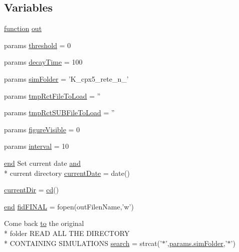 \subsection*{Variables}
\begin{DoxyCompactItemize}
\item 
\hyperlink{a00110_a4b4c670b101bf7a838f775e008fa6255}{function} \hyperlink{a00028_a34c820385e9209f49c18739329ad9206}{out}
\item 
params \hyperlink{a00028_aa022cbb28f80299d572def08e7a5ccfd}{threshold} = 0
\item 
params \hyperlink{a00028_abd7ce2c4bf5f563b1e70731f58e8c57d}{decay\+Time} = 100
\item 
params \hyperlink{a00028_a0ffb8131632b48d9111c3a27d91262e2}{sim\+Folder} = 'K\+\_\+cpx5\+\_\+rete\+\_\+n\+\_\+'
\item 
params \hyperlink{a00028_a3b01c97f207a2997c3bd0c2718441509}{tmp\+Rct\+File\+To\+Load} = ''
\item 
params \hyperlink{a00028_ae5d21adddbfe36d5b10d43a2e8b39123}{tmp\+Rct\+S\+U\+B\+File\+To\+Load} = ''
\item 
params \hyperlink{a00028_a0eef57d24680b0a2e17d81a50229e3cb}{figure\+Visible} = 0
\item 
params \hyperlink{a00028_a4d8f56ee83b9b4dbe17b218746a1768c}{interval} = 10
\item 
\hyperlink{a00025_afb358f48b1646c750fb9da6c6585be2b}{end} Set current date \hyperlink{a00028_a170f8acb213f91bf71c77b1d20bceb33}{and} \\*
current directory \hyperlink{a00028_a54768c0405781065cb2f7a16ab8e7d31}{current\+Date} = date()
\item 
\hyperlink{a00028_af32eb97339f1e9d37b5540de2cbc79c9}{current\+Dir} = \hyperlink{a00113_abe327856a9ee2f30f3ccafe4dc9edf5e}{cd}()
\item 
\hyperlink{a00025_afb358f48b1646c750fb9da6c6585be2b}{end} \hyperlink{a00028_a2f1bf22f6a0c3f5791577061e92c0433}{fid\+F\+I\+N\+A\+L} = fopen(out\+Filen\+Name,'w')
\item 
Come back \hyperlink{a00028_af71dbe52628a3f83a77ab494817525c6}{to} the original \\*
folder R\+E\+A\+D A\+L\+L T\+H\+E D\+I\+R\+E\+C\+T\+O\+R\+Y \\*
C\+O\+N\+T\+A\+I\+N\+I\+N\+G S\+I\+M\+U\+L\+A\+T\+I\+O\+N\+S \hyperlink{a00028_ab3186e0326a3b47b2cfcb5577ab5139f}{search} = strcat('$\ast$',\hyperlink{a00032_aa671e3345005bd599e662bcaa115b18a}{params.\+sim\+Folder},'$\ast$')
\item 

\end{DoxyCompactItemize}
